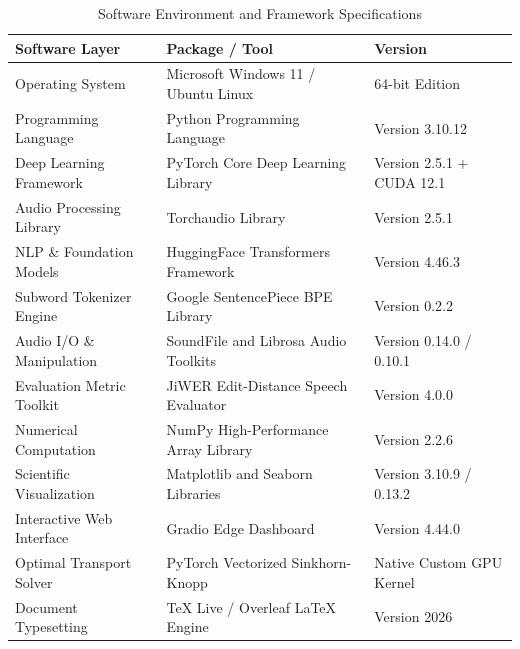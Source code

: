 \begin{table}[htbp]
\centering
\caption{Software Environment and Framework Specifications}
\label{tab:software_specs}
\begin{tabular}{lll}
\toprule
\textbf{Software Layer} & \textbf{Package / Tool} & \textbf{Version} \\
\midrule
Operating System & Microsoft Windows 11 / Ubuntu Linux & 64-bit Edition \\
Programming Language & Python Programming Language & Version 3.10.12 \\
Deep Learning Framework & PyTorch Core Deep Learning Library & Version 2.5.1 + CUDA 12.1 \\
Audio Processing Library & Torchaudio Library & Version 2.5.1 \\
NLP \& Foundation Models & HuggingFace Transformers Framework & Version 4.46.3 \\
Subword Tokenizer Engine & Google SentencePiece BPE Library & Version 0.2.2 \\
Audio I/O \& Manipulation & SoundFile and Librosa Audio Toolkits & Version 0.14.0 / 0.10.1 \\
Evaluation Metric Toolkit & JiWER Edit-Distance Speech Evaluator & Version 4.0.0 \\
Numerical Computation & NumPy High-Performance Array Library & Version 2.2.6 \\
Scientific Visualization & Matplotlib and Seaborn Libraries & Version 3.10.9 / 0.13.2 \\
Interactive Web Interface & Gradio Edge Dashboard & Version 4.44.0 \\
Optimal Transport Solver & PyTorch Vectorized Sinkhorn-Knopp & Native Custom GPU Kernel \\
Document Typesetting & TeX Live / Overleaf LaTeX Engine & Version 2026 \\
\bottomrule
\end{tabular}
\end{table}
